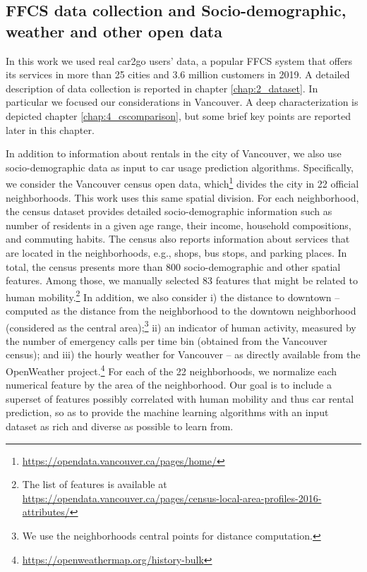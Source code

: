 %


\subsection{FFCS data collection and Socio-demographic, weather and other open data}
In this work we used real car2go users' data, a popular FFCS system that offers its services in more than 25 cities and 3.6 million customers in 2019. A detailed description of data collection is reported in chapter \ref{chap:2_dataset}. In particular we focused our considerations in Vancouver. A deep characterization is depicted chapter \ref{chap:4_cscomparison}, but some brief key points are reported later in this chapter.

In addition to information about rentals in the city of Vancouver, we also use socio-demographic data as input to car usage prediction algorithms. Specifically, we consider the Vancouver census open data, which\footnote{\url{https://opendata.vancouver.ca/pages/home/}} divides the city in 22 official neighborhoods. This work uses this same spatial division. For each neighborhood, the census dataset provides detailed socio-demographic information such as number of residents in a given age range, their income, household compositions, and commuting habits. The census also reports information about services that are located in the neighborhoods, e.g., shops, bus stops, and parking places. In total, the census presents more than 800 socio-demographic and other spatial features. Among those, we manually selected 83 features that might be related to human mobility.\footnote{The list of features is available at \url{https://opendata.vancouver.ca/pages/census-local-area-profiles-2016-attributes/}} 
In addition, we also consider i) the distance to downtown -- computed as the distance from the neighborhood to the downtown neighborhood (considered as the central area);\footnote{We use the neighborhoods central points for distance computation.} ii) an indicator of human activity, measured by the number of emergency calls per time bin (obtained from the Vancouver census);   and iii) the hourly weather for Vancouver -- as directly available from the OpenWeather project.\footnote{\url{https://openweathermap.org/history-bulk}} 
For each of the 22 neighborhoods, we normalize each numerical feature by the area of the neighborhood. 
Our goal is to include a superset of features possibly correlated with human mobility and thus car rental prediction, so as to provide the machine learning algorithms with an input dataset as rich and diverse as possible to learn from.


